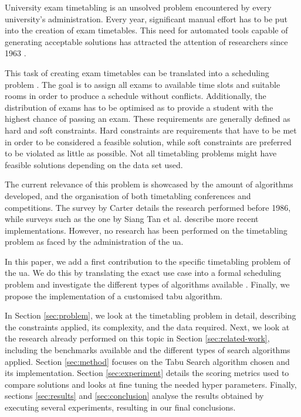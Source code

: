 University exam timetabling is an unsolved problem \cite{even1976} encountered by every university's administration. Every year, significant manual effort has to be put into the creation of exam timetables. This need for automated tools capable of generating acceptable solutions has attracted the attention of researchers since 1963 \cite{gotlieb1963}. 

This task of creating exam timetables can be translated into a scheduling problem \cite{BurkeScheduling2004}. The goal is to assign all exams to available time slots and suitable rooms in order to produce a schedule without conflicts. Additionally, the distribution of exams has to be optimised as to provide a student with the highest chance of passing an exam. These requirements are generally defined as hard and soft constraints. Hard constraints are requirements that have to be met in order to be considered a feasible solution, while soft constraints are preferred to be violated as little as possible. Not all timetabling problems might have feasible solutions depending on the data set used.

The current relevance of this problem is showcased by the amount of algorithms developed, and the organisation of both timetabling conferences and competitions. The survey by Carter \cite{carter1986} details the research performed before 1986, while surveys such as the one by Siang Tan et al. \cite{joo2021} describe more recent implementations. However, no research has been performed on the timetabling problem as faced by the administration of the \acrfull{ua}.

In this paper, we add a first contribution to the specific timetabling problem of the \acrshort{ua}. We do this by translating the exact use case into a formal scheduling problem and investigate the different types of algorithms available \cite{chen2021, kristiansenSurvey2013}. Finally, we propose the implementation of a customised \acrlong{tabu} algorithm.

In Section \ref{sec:problem}, we look at the timetabling problem in detail, describing the constraints applied, its complexity, and the data required. Next, we look at the research already performed on this topic in Section \ref{sec:related-work}, including the benchmarks available and the different types of search algorithms applied. Section \ref{sec:method} focuses on the Tabu Search algorithm chosen and its implementation. Section \ref{sec:experiment} details the scoring metrics used to compare solutions and looks at fine tuning the needed hyper parameters. Finally, sections \ref{sec:results} and \ref{sec:conclusion} analyse the results obtained by executing several experiments, resulting in our final conclusions. 